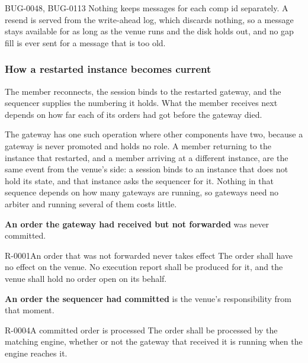 \begin{gap}{BUG-0048, BUG-0113}
  Nothing keeps messages for each comp id separately. A resend is served from the write-ahead log, which discards nothing,
  so a message stays available for as long as the venue runs and the disk holds
  out, and no gap fill is ever sent for a message that is too old.
\end{gap}

\subsubsection{How a restarted instance becomes current}
\label{sec:ha:disabled:gateway:recovery}

The member reconnects, the session binds to the restarted gateway, and the
sequencer supplies the numbering it holds. What the member receives next depends
on how far each of its orders had got before the gateway died.

The gateway has one such operation where other components have two, because a
gateway is never promoted and holds no role. A member returning to the instance
that restarted, and a member arriving at a different instance, are the same event
from the venue's side: a session binds to an instance that does not hold its
state, and that instance asks the sequencer for it. Nothing in that sequence
depends on how many gateways are running, so gateways need no arbiter and running
several of them costs little.

\textbf{An order the gateway had received but not forwarded} was never
committed.

\begin{requirement}{R-0001}{An order that was not forwarded never takes effect}
  The order shall have no effect on the venue. No execution report shall be
  produced for it, and the venue shall hold no order open on its behalf.
\end{requirement}

\textbf{An order the sequencer had committed} is the venue's responsibility from
that moment.

\begin{requirement}{R-0004}{A committed order is processed}
  The order shall be processed by the matching engine, whether or not the
  gateway that received it is running when the engine reaches it.
\end{requirement}

